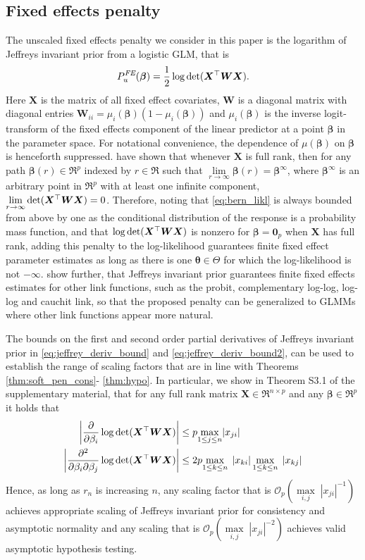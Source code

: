 \documentclass[11pt, a4paper]{article}
\newcommand*{\bb}{\boldsymbol}
\newcommand{\Op}[1]{\ensuremath{{\mathcal{O}_p(#1)}}}
\theoremstyle{example} \newtheorem{example}{Example}[section]
\theoremstyle{theorem} \newtheorem{theorem}{Theorem}[section]
\def\det{{\mathop{\rm det}}}
\def\bbeta{\bb{\beta}}
\def\btheta{\bb{\theta}}
\def\b0{\bb{0}}
\def\bX{\bb{X}}
\def\bW {\bb{W}}
\begin{document}
\subsection{Fixed effects penalty}
\label{sec:glmm_fe_pen}
The unscaled fixed effects penalty we consider in this paper is the logarithm of Jeffreys invariant prior from a logistic GLM, that is $$P_u^{\textit{FE}}(\bbeta) =  \frac{1}{2}\log \det(\bX^\top \bW \bX).$$ Here $\bX$ is the matrix of all fixed effect covariates, $\bW$ is a diagonal matrix with diagonal entries $\bW_{ii} = \mu_i(\bbeta) (1-\mu_i(\bbeta))$ and $\mu_i(\bbeta)$ is the inverse logit-transform of the fixed effects component of the linear predictor at a point $\bbeta$ in the parameter space. For notational convenience, the dependence of $\mu(\bbeta)$ on $\bbeta$ is henceforth suppressed. \citet[Theorem 1]{kosmidis+firth:2020} have shown that whenever $\bX$ is full rank, then for any path $\bbeta(r) \in \Re^p$ indexed by $r \in \Re$ such that $\lim\limits_{r \to \infty} \bbeta(r) = \bbeta^\infty$, where $\bbeta^\infty$ is an arbitrary point in $\Re^p$ with at least one infinite component, $\lim\limits_{r \to \infty} \det(\bX^\top\bW\bX) = 0$. Therefore, noting that \eqref{eq:bern_likl} is always bounded from above by one as the conditional distribution of the response is a probability mass function, and that $\log \det (\bX^\top \bW \bX)$ is nonzero for $\bbeta=\b0_p$ when $\bX$ has full rank, adding this penalty to the log-likelihood guarantees finite fixed effect parameter estimates as long as there is one $\btheta \in \Theta$ for which the log-likelihood is not $-\infty$. \citet{kosmidis+firth:2020} show further, that Jeffreys invariant prior guarantees finite fixed effects estimates for other link functions, such as the probit, complementary log-log, log-log and cauchit link, so that the proposed penalty can be generalized to GLMMs where other link functions appear more natural. 

The bounds on the first and second order partial derivatives of Jeffreys invariant prior in \eqref{eq:jeffrey_deriv_bound} and \eqref{eq:jeffrey_deriv_bound2}, can be used to establish the range of scaling factors that are in line with Theorems \ref{thm:soft_pen_cons}- \ref{thm:hypo}. In particular, we show in Theorem S3.1 of the supplementary material, that for any full rank matrix $\bX \in \Re^{n \times p}$ and any $\bbeta \in \Re^p$ it holds that 
\begin{align}\label{eq:jeffrey_deriv_bound}
\left|\frac{\partial }{\partial \beta_i}\log \textrm{det}(\bX^\top\bW\bX)\right| & \leq p\underset{1\leq j\leq n}{\max} |x_{ji}| \\ \label{eq:jeffrey_deriv_bound2}
\left|\frac{\partial^2}{\partial \beta_i \partial \beta_j} \log\det (\bX^\top \bW \bX) \right| &\leq 2p\underset{1\leq k \leq n}{\max} \; \left|x_{ki}\right| \underset{1\leq k \leq n}{\max} \; \left|x_{kj}\right|  
\end{align}
Hence, as long as $r_n$ is increasing $n$, any scaling factor that is $\Op{\underset{i,j}{\max} \; |x_{ji}|^{-1}}$ achieves appropriate scaling of Jeffreys invariant prior for consistency and asymptotic normality and any scaling that is $\Op{\underset{i,j}{\max} \; |x_{ji}|^{-2}}$ achieves valid asymptotic hypothesis testing. 
\end{document}

